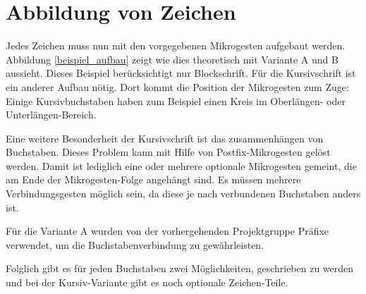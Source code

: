 \section{Abbildung von Zeichen}
Jedes Zeichen muss nun mit den vorgegebenen Mikrogesten aufgebaut werden. Abbildung \ref{beispiel_aufbau} zeigt wie dies theoretisch mit Variante A und B aussieht. Dieses Beispiel berücksichtigt nur Blockschrift. Für die Kursivschrift ist ein anderer Aufbau nötig. Dort kommt die Position der Mikrogesten zum Zuge: Einige Kursivbuchstaben haben zum Beispiel einen Kreis im Oberlängen- oder Unterlängen-Bereich.

Eine weitere Besonderheit der Kursivschrift ist das zusammenhängen von Buchstaben. Dieses Problem kann mit Hilfe von Postfix-Mikrogesten gelöst werden. Damit ist lediglich eine oder mehrere optionale Mikrogesten gemeint, die am Ende der Mikrogesten-Folge angehängt sind. Es müssen mehrere Verbindungsgesten möglich sein, da diese je nach verbundenen Buchstaben anders ist.

Für die Variante A wurden von der vorhergehenden Projektgruppe Präfixe verwendet, um die Buchstabenverbindung zu gewährleisten.

Folglich gibt es für jeden Buchstaben zwei Möglichkeiten, geschrieben zu werden und bei der Kursiv-Variante gibt es noch optionale Zeichen-Teile. 

